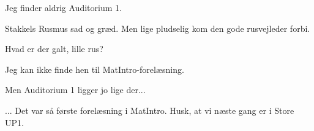 \documentclass[a4paper,11pt]{article}
\begin{document}
\begin{sketch}
 Jeg finder aldrig Auditorium 1.

 Stakkels Rusmus sad og græd. Men lige pludselig kom den gode rusvejleder forbi.

 Hvad er der galt, lille rus?

 Jeg kan ikke finde hen til MatIntro-forelæsning.

 Men Auditorium 1 ligger jo lige der...


 ... Det var så første forelæsning i MatIntro. Husk, at vi næste gang er i Store UP1.

\end{sketch}
\end{document}
